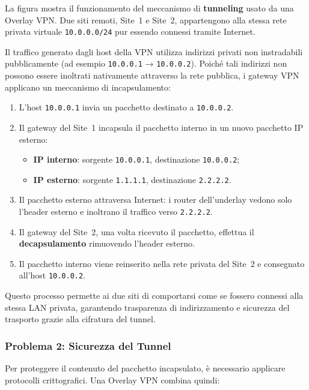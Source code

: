 La figura mostra il funzionamento del meccanismo di \textbf{tunneling} usato da una Overlay VPN.
Due siti remoti, Site~1 e Site~2, appartengono alla stessa rete privata virtuale \texttt{10.0.0.0/24}
pur essendo connessi tramite Internet.

Il traffico generato dagli host della VPN utilizza indirizzi privati non instradabili pubblicamente
(ad esempio \texttt{10.0.0.1} → \texttt{10.0.0.2}). Poiché tali indirizzi non possono essere inoltrati
nativamente attraverso la rete pubblica, i gateway VPN applicano un meccanismo di incapsulamento:

\begin{enumerate}
    \item L'host \texttt{10.0.0.1} invia un pacchetto destinato a \texttt{10.0.0.2}.
    \item Il gateway del Site~1 incapsula il pacchetto interno in un nuovo pacchetto IP esterno:
    \begin{itemize}
        \item \textbf{IP interno}: sorgente \texttt{10.0.0.1}, destinazione \texttt{10.0.0.2};
        \item \textbf{IP esterno}: sorgente \texttt{1.1.1.1}, destinazione \texttt{2.2.2.2}.
    \end{itemize}
    \item Il pacchetto esterno attraversa Internet: i router dell’underlay vedono solo l’header esterno
          e inoltrano il traffico verso \texttt{2.2.2.2}.
    \item Il gateway del Site~2, una volta ricevuto il pacchetto, effettua il \textbf{decapsulamento}
          rimuovendo l’header esterno.
    \item Il pacchetto interno viene reinserito nella rete privata del Site~2 e consegnato all’host
          \texttt{10.0.0.2}.
\end{enumerate}

Questo processo permette ai due siti di comportarsi come se fossero connessi alla stessa LAN privata,
garantendo trasparenza di indirizzamento e sicurezza del trasporto grazie alla cifratura del tunnel.



\subsubsection{Problema 2: Sicurezza del Tunnel}

Per proteggere il contenuto del pacchetto incapsulato, è necessario applicare protocolli crittografici.
Una Overlay VPN combina quindi:

